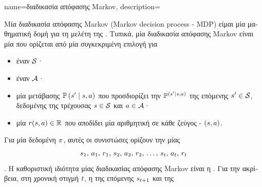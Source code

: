 {name={\foreignlanguage{greek}{διαδικασία απόφασης} Markov},
	description={\foreignlanguage{greek}{Μία διαδικασία απόφασης} 
		Markov (Markov decision process - MDP) 
		\foreignlanguage{greek}{είμαι μία μαθηματική δομή για τη μελέτη της} . 
		\foreignlanguage{greek}{Τυπικά, μία διαδικασία απόφασης} Markov \foreignlanguage{greek}{είναι μία} 
		 \foreignlanguage{greek}{που ορίζεται από μία συγκεκριμένη επιλογή για} 
		\begin{itemize}
   			\item \foreignlanguage{greek}{έναν}  $\mathcal{S}$· 
    			\item \foreignlanguage{greek}{έναν}  $\mathcal{A}$· 
    			\item \foreignlanguage{greek}{μία}  \foreignlanguage{greek}{μετάβασης} 
				$\mathbb{P}\left(s' \mid s, a\right)$ \foreignlanguage{greek}{που προσδιορίζει την} 
				 $\mathbb{P}^{(s' \mid s, a)}$
				\foreignlanguage{greek}{της επόμενης}  $s' \in \mathcal{S}$, 
				\foreignlanguage{greek}{δεδομένης της τρέχουσας}  
				$s \in \mathcal{S}$ \foreignlanguage{greek}{και}  $a \in \mathcal{A}$· 
    			\item \foreignlanguage{greek}{μία}   
				$r(s, a) \in \mathbb{R}$ \foreignlanguage{greek}{που αποδίδει μία αριθμητική} 
				 \foreignlanguage{greek}{σε κάθε ζεύγος} -
				$(s,a)$.
		\end{itemize}
		\foreignlanguage{greek}{Για μία δεδομένη}  $\pi$, \foreignlanguage{greek}{αυτές οι συνιστώσες 
		ορίζουν την}  \foreignlanguage{greek}{μίας} 
		$$ s_{1},\,a_{1},\,r_{1},\,s_{2},\,a_{2},\,r_{2},\,\ldots,\,s_{t},\,a_{t},\,r_{t}$$ 
		. \foreignlanguage{greek}{Η καθοριστική ιδιότητα μίας διαδικασίας απόφασης} Markov 
		\foreignlanguage{greek}{είναι η} . 
		\foreignlanguage{greek}{Για την ακρίβεια, στη χρονική στιγμή $t$, η}  
		\foreignlanguage{greek}{της επόμενης}  $s_{t+1}$ \foreignlanguage{greek}{και της} 
}}
